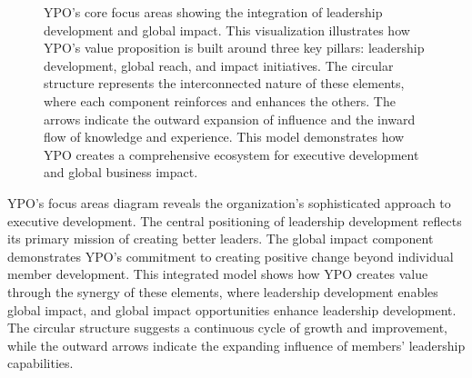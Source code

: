 \documentclass[conference]{IEEEtran}
\begin{document}
\begin{figure}[t]
\centering
{}
\caption{YPO's core focus areas showing the integration of leadership development and global impact. This visualization illustrates how YPO's value proposition is built around three key pillars: leadership development, global reach, and impact initiatives. The circular structure represents the interconnected nature of these elements, where each component reinforces and enhances the others. The arrows indicate the outward expansion of influence and the inward flow of knowledge and experience. This model demonstrates how YPO creates a comprehensive ecosystem for executive development and global business impact.}
\label{fig:ypo_focus}
\end{figure}

YPO's focus areas diagram reveals the organization's sophisticated approach to executive development. The central positioning of leadership development reflects its primary mission of creating better leaders. The global impact component demonstrates YPO's commitment to creating positive change beyond individual member development. This integrated model shows how YPO creates value through the synergy of these elements, where leadership development enables global impact, and global impact opportunities enhance leadership development. The circular structure suggests a continuous cycle of growth and improvement, while the outward arrows indicate the expanding influence of members' leadership capabilities.
\end{document}
